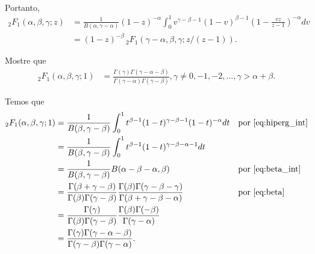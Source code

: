 \documentclass[a4paper,12pt, leqno, answers]{exam}
\begin{document}
\begin{questions}
\begin{parts}
\begin{solution}
\begin{align*}
            \end{align*}
            Portanto,
            \begin{align*}
                {}_2F_1(\alpha, \beta, \gamma; z) &= \frac{1}{B(\alpha, \gamma - \alpha)} (1 - z)^{-\alpha} \int_0^1 v^{\gamma - \beta - 1} (1 - v)^{\beta - 1} \left( 1 - \frac{vz}{z - 1} \right)^{-\alpha} dv \\
                &= (1 - z)^{-\beta} \,_2F_1(\gamma - \alpha, \beta, \gamma; z / (z - 1)).
            \end{align*}
        \end{solution}
    \end{parts}

     Mostre que
    \begin{align*}
        _2F_1(\alpha, \beta, \gamma; 1) &= \frac{\Gamma(\gamma)\Gamma(\gamma - \alpha - \beta)}{\Gamma(\gamma - \alpha) \Gamma(\gamma - \beta)}, \gamma \neq 0, -1, -2, \ldots, \gamma > \alpha + \beta.
    \end{align*}
    \begin{solution}
        Temos que
        \begin{align*}
            {}_2F_1(\alpha, \beta, \gamma; 1) &= \frac{1}{B(\beta, \gamma - \beta)} \int_0^1 t^{\beta - 1} (1 - t)^{\gamma - \beta - 1} (1 - t)^{-\alpha} dt && \text{por \eqref{eq:hiperg_int}} \\
            &= \frac{1}{B(\beta, \gamma - \beta)} \int_0^1 t^{\beta - 1} (1 - t)^{\gamma - \beta - \alpha - 1} dt \\
            &= \frac{1}{B(\beta, \gamma - \beta)} B(\alpha - \beta - \alpha, \beta) && \text{por \eqref{eq:beta_int}} \\
            &= \frac{\Gamma(\beta + \gamma - \beta)}{\Gamma(\beta) \Gamma(\gamma - \beta)} \frac{\Gamma(\beta) \Gamma(\gamma - \beta - \gamma)}{\Gamma(\beta + \gamma - \beta - \alpha)} && \text{por \eqref{eq:beta}} \\
            &= \frac{\Gamma(\gamma)}{\Gamma(\beta) \Gamma(\gamma - \beta)} \frac{\Gamma(\beta) \Gamma(- \beta)}{\Gamma(\gamma - \alpha)} \\
            &= \frac{\Gamma(\gamma) \Gamma(\gamma - \alpha - \beta)}{\Gamma(\gamma - \beta) \Gamma(\gamma - \alpha)}.
        \end{align*}
    \end{solution}


\end{questions}
\end{document}
